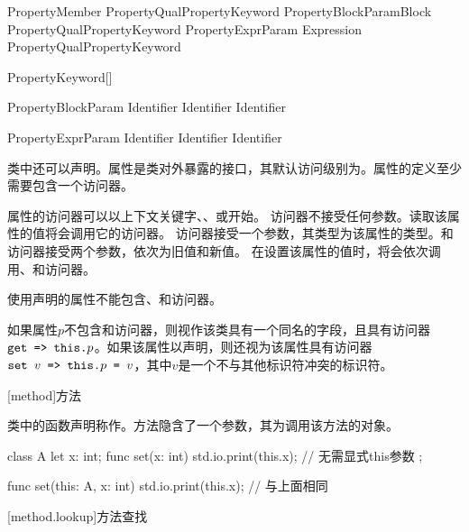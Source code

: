 \begin{bnf}{PropertyMember}
    PropertyQual\bnfs PropertyKeyword PropertyBlockParam\bnfq Block \br
    PropertyQual\bnfs PropertyKeyword PropertyExprParam\bnfq \terminal{=>} Expression \terminal{,}\bnfq \br
    PropertyQual\bnfs PropertyKeyword
\end{bnf}

\begin{bnf}{PropertyKeyword}[\oneof]
\end{bnf}

\begin{bnf}{PropertyBlockParam}
    Identifier \br
    Identifier \terminal{,} Identifier
\end{bnf}

\begin{bnf}{PropertyExprParam}
    Identifier \br
    \terminal{(} Identifier \terminal{,} Identifier \terminal{)}
\end{bnf}

\pnum
类中还可以声明。属性是类对外暴露的接口，其默认访问级别为。属性的定义至少需要包含一个访问器。

\pnum
属性的访问器可以以上下文关键字、、或开始。
访问器不接受任何参数。读取该属性的值将会调用它的访问器。
访问器接受一个参数，其类型为该属性的类型。和访问器接受两个参数，依次为旧值和新值。
在设置该属性的值时，将会依次调用、和访问器。

\pnum
使用声明的属性不能包含、和访问器。

\pnum
如果属性$p$不包含和访问器，则视作该类具有一个同名的字段，且具有访问器$\texttt{get => this.}p$。如果该属性以声明，则还视为该属性具有访问器$\texttt{set }v\texttt{ => this.}p\texttt{ = }v$，其中$v$是一个不与其他标识符冲突的标识符。


[method]{方法}

\pnum
类中的函数声明称作。方法隐含了一个参数，其为调用该方法的对象。

\enterexample
\begin{codeblock}
class A {
    let x: int;
    func set(x: int) {
        std.io.print(this.x); // 无需显式this参数
    }
};

func set(this: A, x: int) {
    std.io.print(this.x); // 与上面相同
}

\end{codeblock}
\exitexample

[method.lookup]{方法查找}

\pnum
